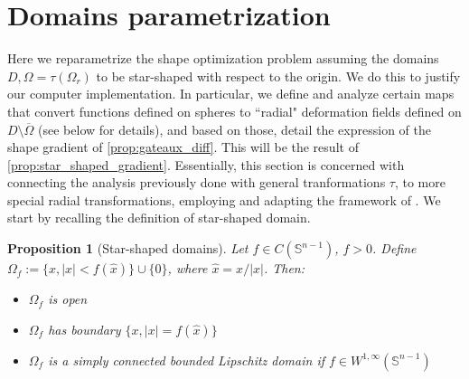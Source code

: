 \documentclass[english,a4paper,9pt,oneside]{scrbook}	%
\theoremstyle{break}
\newtheorem{prop}[equation]{Proposition}
\theoremstyle{remark}
\newtheorem{obs}[equation]{Observation}
\newcommand{\mS}{\mathbb{S}^{n-1}}
\newcommand{\xh}{\hat{x}}
\begin{document}

\section{Domains parametrization}
\label{sec:star}

Here we reparametrize the shape optimization problem assuming the domains $D, \Omega=\tau(\Omega_r)$ to be star-shaped with respect to the origin. We do this to justify our computer implementation. In particular, we define and analyze certain maps that convert functions defined on spheres to ``radial" deformation fields defined on $D\setminus \overline{\Omega}$ (see below for details), and based on those, detail the expression of the shape gradient of \cref{prop:gateaux_diff}. This will be the result of \cref{prop:star_shaped_gradient}. Essentially, this section is concerned with connecting the analysis previously done with general tranformations $\tau$, to more special radial transformations, employing and adapting the framework of \cite{deckelnick}. We start by recalling the definition of star-shaped domain.


\begin{prop}[Star-shaped domains]
Let $f \in C(\mS)$, $f>0$. Define $\Omega_f:=\{x, |x|<f(\xh)\}\cup\{0\}$, where $\xh=x/|x|$. Then:
\begin{itemize}
\item $\Omega_f$ is open
\item $\Omega_f$ has boundary $\{x, |x|=f(\xh)\}$
\item $\Omega_f$ is a simply connected bounded Lipschitz domain if $f \in W^{1,\infty}(\mS)$
\end{itemize}
\end{prop}
%
\end{document}
